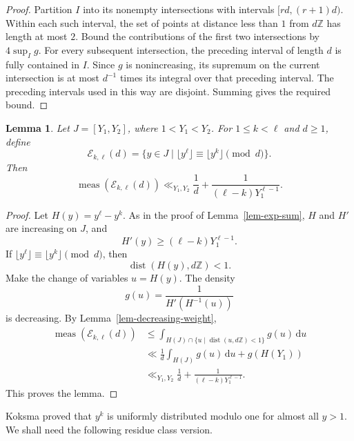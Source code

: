 \documentclass[11pt,reqno]{amsart}
\numberwithin{equation}{section}
\newtheorem{lemma}[theorem]{Lemma}
\begin{document}
    \begin{proof}
        Partition $I$ into its nonempty intersections with intervals $[rd,(r+1)d)$. Within each such interval, the set of points at distance less than $1$ from $d\mathbb{Z}$ has length at most $2$. Bound the contributions of the first two intersections by $4\sup_I g$. For every subsequent intersection, the preceding interval of length $d$ is fully contained in $I$. Since $g$ is nonincreasing, its supremum on the current intersection is at most $d^{-1}$ times its integral over that preceding interval. The preceding intervals used in this way are disjoint. Summing gives the required bound.
    \end{proof}

    \begin{lemma}\label{lem-collision}
        Let $J=[Y_1,Y_2]$, where $1<Y_1<Y_2$. For $1\le k<\ell$ and $d\ge1$, define
        $$
        \mathcal{E}_{k,\ell}(d)=\bigl\{y\in J\mid
        \lfloor y^\ell\rfloor\equiv \lfloor y^k\rfloor\pmod d\bigr\}.
        $$
        Then
        $$
        \operatorname{meas}(\mathcal{E}_{k,\ell}(d))
        \ll_{Y_1,Y_2}
        \frac1d+\frac1{(\ell-k)Y_1^{\ell-1}}.
        $$
    \end{lemma}

    \begin{proof}
        Let $H(y)=y^\ell-y^k$. As in the proof of Lemma~\ref{lem-exp-sum}, $H$ and $H'$ are increasing on $J$, and
        $$
        H'(y)\ge (\ell-k)Y_1^{\ell-1}.
        $$
        If $\lfloor y^\ell\rfloor\equiv\lfloor y^k\rfloor\pmod d$, then
        $$
        \operatorname{dist}(H(y),d\mathbb{Z})<1.
        $$
        Make the change of variables $u=H(y)$. The density
        $$
        g(u)=\frac{1}{H'(H^{-1}(u))}
        $$
        is decreasing. By Lemma~\ref{lem-decreasing-weight},
        \begin{align*}
            \operatorname{meas}(\mathcal{E}_{k,\ell}(d))
            &\le
            \int_{H(J)\cap\{u\mid \operatorname{dist}(u,d\mathbb{Z})<1\}}g(u)\,\mathrm{d}u    \\
            &\ll \frac1d\int_{H(J)}g(u)\,\mathrm{d}u+g(H(Y_1)) \\
            &\ll_{Y_1,Y_2} \frac1d+\frac1{(\ell-k)Y_1^{\ell-1}}.
        \end{align*}
        This proves the lemma.
    \end{proof}

    Koksma \cite{Koksma} proved that $y^k$ is uniformly distributed modulo one for almost all $y>1$. We shall need the following residue class version.
\end{document}
